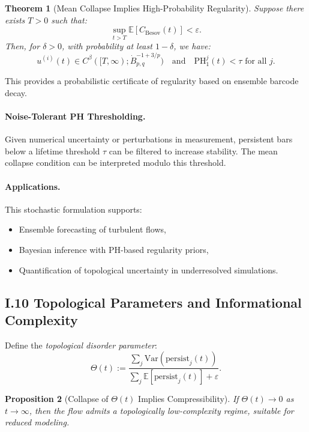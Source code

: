 \documentclass[11pt]{article}
\newtheorem{theorem}{Theorem}[section]
\newtheorem{proposition}[theorem]{Proposition}
\theoremstyle{definition}
\begin{document}
\begin{theorem}[Mean Collapse Implies High-Probability Regularity]
Suppose there exists $T > 0$ such that:
\[ \sup_{t > T} \mathbb{E}[C_{\text{Besov}}(t)] < \varepsilon. \]
Then, for $\delta > 0$, with probability at least $1 - \delta$, we have:
\[ u^{(i)}(t) \in C^\beta([T, \infty); \dot{B}^{-1+3/p}_{p,q}) \quad \text{and} \quad \mathrm{PH}_1^j(t) < \tau \text{ for all } j. \]
\end{theorem}

This provides a probabilistic certificate of regularity based on ensemble barcode decay.

\paragraph{Noise-Tolerant PH Thresholding.} Given numerical uncertainty or perturbations in measurement, persistent bars below a lifetime threshold $\tau$ can be filtered to increase stability. The mean collapse condition can be interpreted modulo this threshold.

\paragraph{Applications.} This stochastic formulation supports:
\begin{itemize}
  \item Ensemble forecasting of turbulent flows,
  \item Bayesian inference with PH-based regularity priors,
  \item Quantification of topological uncertainty in underresolved simulations.
\end{itemize}

\subsection*{I.10 Topological Parameters and Informational Complexity}

Define the \emph{topological disorder parameter}:
\[ \Theta(t) := \frac{\sum_j \mathrm{Var}(\mathrm{persist}_j(t))}{\sum_j \mathbb{E}[\mathrm{persist}_j(t)] + \varepsilon}. \]

\begin{proposition}[Collapse of $\Theta(t)$ Implies Compressibility]
If $\Theta(t) \to 0$ as $t \to \infty$, then the flow admits a topologically low-complexity regime, suitable for reduced modeling.
\end{proposition}
\end{document}
